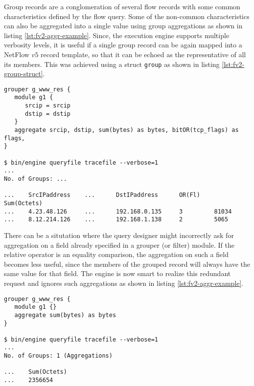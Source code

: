 Group records are a conglomeration of several flow records with some common
characteristics defined by the flow query. Some of the non-common
characteristics can also be aggregated into a single value using group
 aggregations as shown in
listing \ref{lst:fv2-aggr-example}. Since, the execution engine supports
multiple verbosity levels, it is useful if a single group record can be again
mapped into a NetFlow $v5$ record template, so that it can be echoed as the
representative of all its members. This was achieved using a struct
\texttt{group} as shown in listing \ref{lst:fv2-group-struct}.

\begin{lstlisting}
grouper g_www_res {
   module g1 {
      srcip = srcip
      dstip = dstip
   }
   aggregate srcip, dstip, sum(bytes) as bytes, bitOR(tcp_flags) as flags,
}

$ bin/engine queryfile tracefile --verbose=1
...
No. of Groups: ...

...    SrcIPaddress    ...      DstIPaddress      OR(Fl)    Sum(Octets)
...    4.23.48.126     ...      192.168.0.135     3         81034
...    8.12.214.126    ...      192.168.1.138     2         5065
\end{lstlisting}

There can be a situtation where the query designer might incorrectly ask
for aggregation on a field already specified in a grouper (or filter)
module. If  the
relative operator is an equality comparison, the aggregation on such a
field becomes less useful, since the members of the grouped record will
always have the same value for that field. The engine is now smart to
realize this redundant request and ignores such aggregations as shown in
listing \ref{lst:fv2-aggr-example}.

\begin{lstlisting}
grouper g_www_res {
   module g1 {}
   aggregate sum(bytes) as bytes
}

$ bin/engine queryfile tracefile --verbose=1
...
No. of Groups: 1 (Aggregations)

...    Sum(Octets)
...    2356654
\end{lstlisting}

